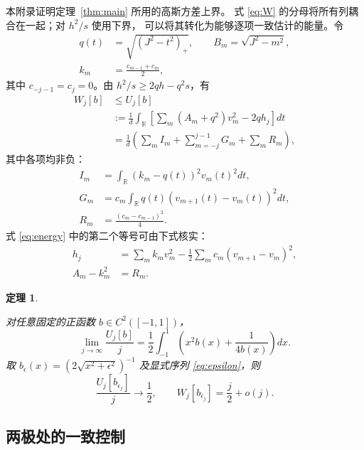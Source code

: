 \documentclass[aps,pra,reprint,superscriptaddress,longbibliography]{revtex4-2}
\newtheorem{theorem}{定理}
\theoremstyle{remark}
\newcommand{\R}{\mathbb R}
\begin{document}
本附录证明定理~\ref{thm:main} 所用的高斯方差上界。
式 \eqref{eq:W} 的分母将所有列耦合在一起；对 $h^2/s$ 使用下界，
可以将其转化为能够逐项一致估计的能量。令
\begin{equation}
\begin{aligned}
q(t)&=\sqrt{(J^2-t^2)_+},\qquad B_m=\sqrt{J^2-m^2},\\
k_m&=\frac{c_{m-1}+c_m}{2},
\end{aligned}
\label{eq:q}
\end{equation}
其中 $c_{-j-1}=c_j=0$。由 $h^2/s\geq2qh-q^2s$，有
\begin{equation}
\begin{aligned}
W_j[b]&\leq U_j[b]\\
&:=\frac1d\int_\R
\left[\sum_m(A_m+q^2)v_m^2-2qh_j\right]dt\\
&=\frac1d\left(\sum_m I_m+\sum_{m=-j}^{j-1}G_m+\sum_m R_m\right),
\end{aligned}
\label{eq:energy}
\end{equation}
其中各项均非负：
\begin{equation}
\begin{aligned}
I_m&=\int_\R(k_m-q(t))^2v_m(t)^2dt,\\
G_m&=c_m\int_\R q(t)(v_{m+1}(t)-v_m(t))^2dt,\\
R_m&=\frac{(c_m-c_{m-1})^2}{4}.
\end{aligned}
\label{eq:energies}
\end{equation}
式 \eqref{eq:energy} 中的第二个等号可由下式核实：
\begin{align*}
 h_j&=\sum_m k_mv_m^2-\frac12\sum_m c_m(v_{m+1}-v_m)^2,\\
 A_m-k_m^2&=R_m.
\end{align*}
\begin{theorem}\label{thm:energy}

对任意固定的正函数 $b\in C^2([-1,1])$，
\begin{equation}
 \lim_{j\to\infty}\frac{U_j[b]}j
 =\frac12\int_{-1}^1
 \left(x^2b(x)+\frac1{4b(x)}\right)dx.
 \label{eq:functional}
\end{equation}
取 $b_\epsilon(x)=(2\sqrt{x^2+\epsilon^2})^{-1}$ 及显式序列 \eqref{eq:epsilon}，则
\begin{equation}
 \frac{U_j[b_{\epsilon_j}]}j\longrightarrow\frac12,
 \qquad W_j[b_{\epsilon_j}]=\frac j2+o(j).
 \label{eq:explicit-energy}
\end{equation}
\end{theorem}

\subsection{两极处的一致控制}
\end{document}
